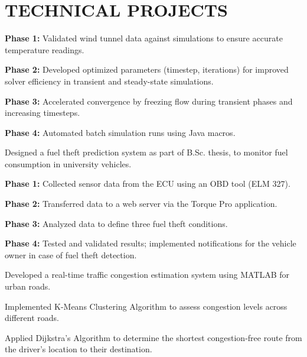 \documentclass[]{hussain-resume-openfont}
\begin{document}
\begin{minipage}[t]{0.63\textwidth}


\section{TECHNICAL PROJECTS}
\vspace{0.9em}
\begin{tightemize}
   \justifying
    \item \textbf{Phase 1:} Validated wind tunnel data against simulations to ensure accurate temperature readings.
    \item \textbf{Phase 2:} Developed optimized parameters (timestep, iterations) for improved solver efficiency in transient and steady-state simulations.
    \item \textbf{Phase 3:} Accelerated convergence by freezing flow during transient phases and increasing timesteps.
    \item \textbf{Phase 4:} Automated batch simulation runs using Java macros.
\end{tightemize}
\sectionsep

\begin{tightemize}
\justifying
\item Designed a fuel theft prediction system as part of B.Sc. thesis, to monitor fuel consumption in university vehicles.
    \item \textbf{Phase 1:} Collected sensor data from the ECU using an OBD tool (ELM 327).
    \item \textbf{Phase 2:} Transferred data to a web server via the Torque Pro application.
    \item \textbf{Phase 3:} Analyzed data to define three fuel theft conditions.
    \item \textbf{Phase 4:} Tested and validated results; implemented notifications for the vehicle owner in case of fuel theft detection.
\end{tightemize}
\sectionsep

\begin{tightemize}
\justifying
     \item Developed a real-time traffic congestion estimation system using MATLAB for urban roads.
    \item Implemented K-Means Clustering Algorithm to assess congestion levels across different roads.
    \item Applied Dijkstra’s Algorithm to determine the shortest congestion-free route from the driver’s location to their destination.
\end{tightemize}
\sectionsep


\end{minipage}
\end{document}
